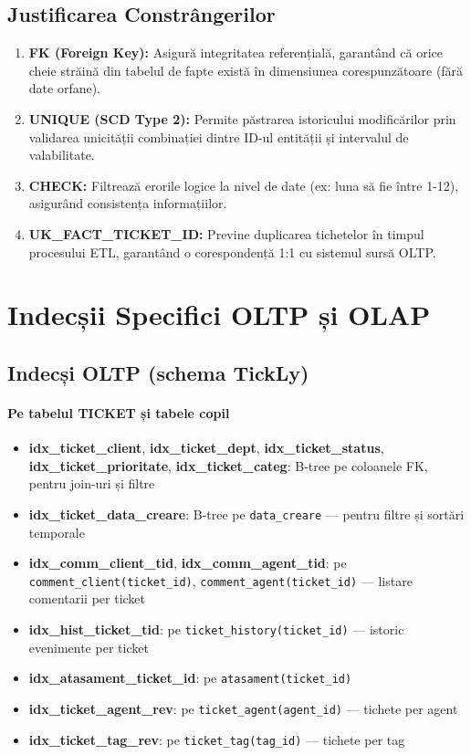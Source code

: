 \section{Justificarea Constrângerilor}

\begin{enumerate}
    \item \textbf{FK (Foreign Key):} Asigură integritatea referențială, garantând că orice cheie străină din tabelul de fapte există în dimensiunea corespunzătoare (fără date orfane).
    \item \textbf{UNIQUE (SCD Type 2):} Permite păstrarea istoricului modificărilor prin validarea unicității combinației dintre ID-ul entității și intervalul de valabilitate.
    \item \textbf{CHECK:} Filtrează erorile logice la nivel de date (ex: luna să fie între 1-12), asigurând consistența informațiilor.
    \item \textbf{UK\_FACT\_TICKET\_ID:} Previne duplicarea tichetelor în timpul procesului ETL, garantând o corespondență 1:1 cu sistemul sursă OLTP.
\end{enumerate}

\chapter{Indecșii Specifici OLTP și OLAP}
\label{sec:indecsi}

\section{Indecși OLTP (schema TickLy)}

\subsubsection{Pe tabelul TICKET și tabele copil}

\begin{itemize}
    \item \textbf{idx\_ticket\_client}, \textbf{idx\_ticket\_dept}, \textbf{idx\_ticket\_status}, \textbf{idx\_ticket\_prioritate}, \textbf{idx\_ticket\_categ}: B-tree pe coloanele FK, pentru join-uri și filtre
    \item \textbf{idx\_ticket\_data\_creare}: B-tree pe \texttt{data\_creare} — pentru filtre și sortări temporale
    \item \textbf{idx\_comm\_client\_tid}, \textbf{idx\_comm\_agent\_tid}: pe \texttt{comment\_client(ticket\_id)}, \texttt{comment\_agent(ticket\_id)} — listare comentarii per ticket
    \item \textbf{idx\_hist\_ticket\_tid}: pe \texttt{ticket\_history(ticket\_id)} — istoric evenimente per ticket
    \item \textbf{idx\_atasament\_ticket\_id}: pe \texttt{atasament(ticket\_id)}
    \item \textbf{idx\_ticket\_agent\_rev}: pe \texttt{ticket\_agent(agent\_id)} — tichete per agent
    \item \textbf{idx\_ticket\_tag\_rev}: pe \texttt{ticket\_tag(tag\_id)} — tichete per tag
\end{itemize}

